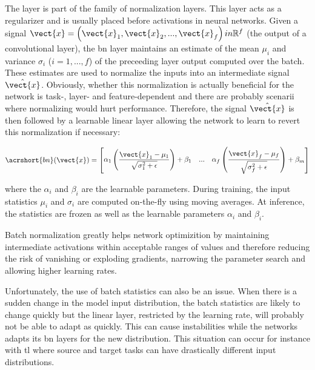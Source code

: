 The  \parencite{ioffe2015batch} layer is part of the family of
normalization layers. This layer acts as a regularizer and is usually placed before
activations in neural networks. Given a signal $\vect{x} = \left(\vect{x}_1, \vect{x}_2, ..., \vect{x}_f\right) in \mathbb{R}^f$
(\eg the output of a convolutional layer), the \acrshort{bn} layer maintains an
estimate of the mean $\mu_i$ and variance $\sigma_i$ ($i = 1, ..., f$) of the
preceeding layer output computed over the batch. These estimates are used to
normalize the inputs into an intermediate signal $\hat{\vect{x}}$. Obviously, whether this normalization is actually beneficial
for the network is task-, layer- and feature-dependent and there are
probably scenarii where normalizing would hurt performance. Therefore, the signal
$\hat{\vect{x}}$ is then followed by a learnable linear layer allowing the network
to learn to revert this normalization if necessary:

\begin{equation}
\label{eqn:backml:bn}
\acrshort{bn}(\vect{x}) = \begin{bmatrix}
\alpha_1 \left(\dfrac{\vect{x}_1 - \mu_1}{\sqrt{\sigma^2_1 + \epsilon}}\right) + \beta_1 & ... & \alpha_f \left(\dfrac{\vect{x}_f - \mu_f}{\sqrt{\sigma^2_f + \epsilon}}\right) + \beta_m \\
\end{bmatrix}\end{equation}

where the $\alpha_i$ and $\beta_i$ are the learnable parameters. During training,
the input statistics $\mu_i$ and $\sigma_i$ are computed on-the-fly using moving
averages. At inference, the statistics are frozen as well as the learnable parameters
$\alpha_i$ and $\beta_i$.

Batch normalization greatly helps network optimizition by maintaining intermediate
activations within acceptable ranges of values and therefore reducing the risk of
vanishing or exploding gradients, narrowing the parameter search and allowing
higher learning rates.

Unfortunately, the use of batch statistics can also be an issue. When there is a
sudden change in the model input distribution, the batch statistics are likely to
change quickly but the linear layer, restricted by the learning rate, will probably
not be able to adapt as quickly. This can cause instabilities while the networks
adapts its \acrlong{bn} layers for the new distribution. This situation can occur
for instance with \acrlong{tl} where source and target tasks can have drastically
different input distributions.

